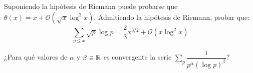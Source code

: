 \documentclass[twoside]{article}
\begin{document}
\newpage

\begin{ejercicio}{13}
Suponiendo la hipótesis de Riemann puede probarse que $θ(x) = x + \mathcal{O}(\sqrt{x} \log^2x)$. Admitiendo la hipótesis de Riemann, probar que:
\[ \sum_{p≤x} \sqrt{p}\log p = \frac{2}{3} x^{3/2} + \mathcal{O}(x\log^2 x) \]
\end{ejercicio}

\newpage

\begin{ejercicio}{14}
¿Para qué valores de $α$ y $β$ $\in \mathbb{R}$ es convergente la serie $\sum\limits_p \dfrac{1}{p^α(\log p)^β}$?
\end{ejercicio}
\end{document}
